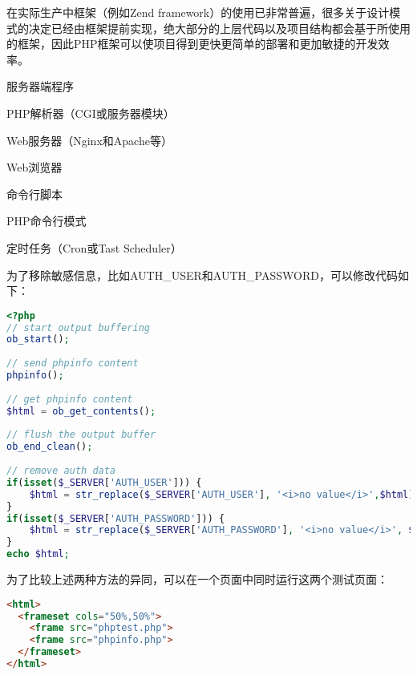 在实际生产中框架（例如Zend framework）的使用已非常普遍，很多关于设计模式的决定已经由框架提前实现，绝大部分的上层代码以及项目结构都会基于所使用的框架，因此PHP框架可以使项目得到更快更简单的部署和更加敏捷的开发效率。


\begin{compactitem}
\item 服务器端程序

\begin{compactenum}
\item PHP解析器（CGI或服务器模块）
\item Web服务器（Nginx和Apache等）
\item Web浏览器
\end{compactenum}

\item 命令行脚本

\begin{compactenum}
\item PHP命令行模式
\item 定时任务（Cron或Tast Scheduler）
\end{compactenum}

\end{compactitem}










为了移除敏感信息，比如AUTH\_USER和AUTH\_PASSWORD，可以修改代码如下：

\begin{lstlisting}[language=PHP]
<?php
// start output buffering
ob_start();
  
// send phpinfo content
phpinfo();
  
// get phpinfo content
$html = ob_get_contents();
  
// flush the output buffer
ob_end_clean();
  
// remove auth data
if(isset($_SERVER['AUTH_USER'])) {
    $html = str_replace($_SERVER['AUTH_USER'], '<i>no value</i>',$html);
}
if(isset($_SERVER['AUTH_PASSWORD'])) {
    $html = str_replace($_SERVER['AUTH_PASSWORD'], '<i>no value</i>', $html);
}
echo $html;
\end{lstlisting}

为了比较上述两种方法的异同，可以在一个页面中同时运行这两个测试页面：

\begin{lstlisting}[language=HTML]
<html>
  <frameset cols="50%,50%">
    <frame src="phptest.php">
    <frame src="phpinfo.php">
  </frameset>
</html>
\end{lstlisting}

